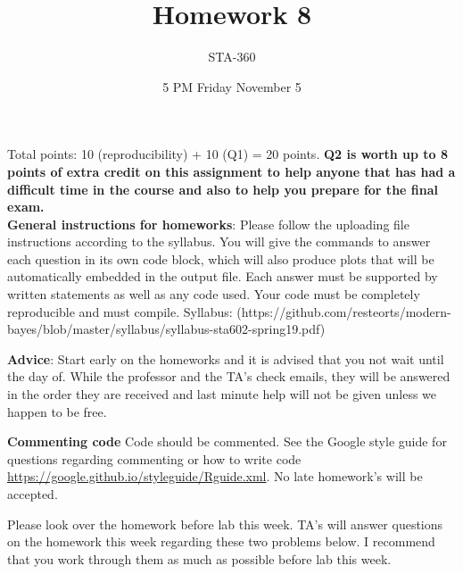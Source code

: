\documentclass{article}
\begin{document}
\title{Homework 8}
\author{STA-360}
\date{5 PM Friday November 5}
\maketitle

Total points: 10 (reproducibility) + 10 (Q1) = 20 points. \textbf{Q2 is worth up to 8 points of extra credit on this assignment to help anyone that has had a difficult time in the course and also to help you prepare for the final exam.} \\

\textbf{General instructions for homeworks}: Please follow the uploading file instructions according to the syllabus. You will give the commands to answer each question in its own code block, which will also produce plots that will be automatically embedded in the output file. Each answer must be supported by written statements as well as any code used. Your code must be completely reproducible and must compile. Syllabus: (https://github.com/resteorts/modern-bayes/blob/master/syllabus/syllabus-sta602-spring19.pdf)

\textbf{Advice}: Start early on the homeworks and it is advised that you not wait until the day of. While the professor and the TA's check emails, they will be answered in the order they are received and last minute help will not be given unless we happen to be free.  

\textbf{Commenting code}
Code should be commented. See the Google style guide for questions regarding commenting or how to write 
code \url{https://google.github.io/styleguide/Rguide.xml}. No late homework's will be accepted.

Please look over the homework before lab this week. TA's will answer questions on the homework this week regarding these two 
problems below. I recommend that you work through them as much as possible before lab this week. 
\end{document}
